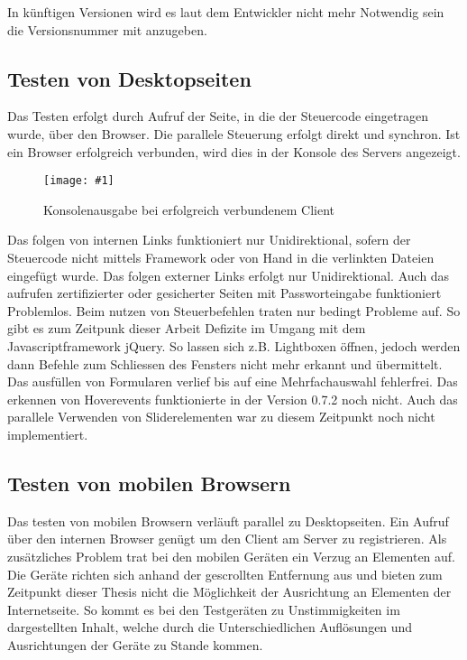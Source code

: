 \documentclass[13pt,a4paper,oneside]{scrbook} %
\renewcommand{\\}{\bigskip}
\newcommand{\iga}[3]{
\begin{figure}[H]
	\centering
	\texttt{[image: \#1]}%
	\caption[#2]{#3}%
\end{figure}
}
\begin{document}
	In künftigen Versionen wird es laut dem Entwickler nicht mehr Notwendig sein die Versionsnummer mit anzugeben.
	
	\subsection{Testen von Desktopseiten}
	Das Testen erfolgt durch Aufruf der Seite, in die der Steuercode eingetragen wurde, über den Browser. Die parallele Steuerung erfolgt direkt und synchron. Ist ein Browser erfolgreich verbunden, wird dies in der Konsole des Servers angezeigt.
	\iga{../pictures/browser-sync/connected}{Browser-Sync verbundener Client}{Konsolenausgabe bei erfolgreich verbundenem Client}
	Das folgen von internen Links funktioniert nur Unidirektional, sofern der Steuercode nicht mittels Framework oder von Hand in die verlinkten Dateien eingefügt wurde. Das folgen externer Links erfolgt nur Unidirektional. Auch das aufrufen zertifizierter oder gesicherter Seiten mit Passworteingabe funktioniert Problemlos. Beim nutzen von Steuerbefehlen traten nur bedingt Probleme auf. So gibt es zum Zeitpunk dieser Arbeit Defizite im Umgang mit dem Javascriptframework jQuery. So lassen sich z.B. Lightboxen öffnen, jedoch werden dann Befehle zum Schliessen des Fensters nicht mehr erkannt und übermittelt. Das ausfüllen von Formularen verlief bis auf eine Mehrfachauswahl fehlerfrei. Das erkennen von Hoverevents funktionierte in der Version 0.7.2 noch nicht. Auch das parallele Verwenden von Sliderelementen war zu diesem Zeitpunkt noch nicht implementiert.
	
	\subsection{Testen von mobilen Browsern}
	Das testen von mobilen Browsern verläuft parallel zu Desktopseiten. Ein Aufruf über den internen Browser genügt um den Client am Server zu registrieren. Als zusätzliches Problem trat bei den mobilen Geräten ein Verzug an Elementen auf. Die Geräte richten sich anhand der gescrollten Entfernung aus und bieten zum Zeitpunkt dieser Thesis nicht die Möglichkeit der Ausrichtung an Elementen der Internetseite. So kommt es bei den Testgeräten zu Unstimmigkeiten im dargestellten Inhalt, welche durch die Unterschiedlichen Auflösungen und Ausrichtungen der Geräte zu Stande kommen.
	
\end{document}
